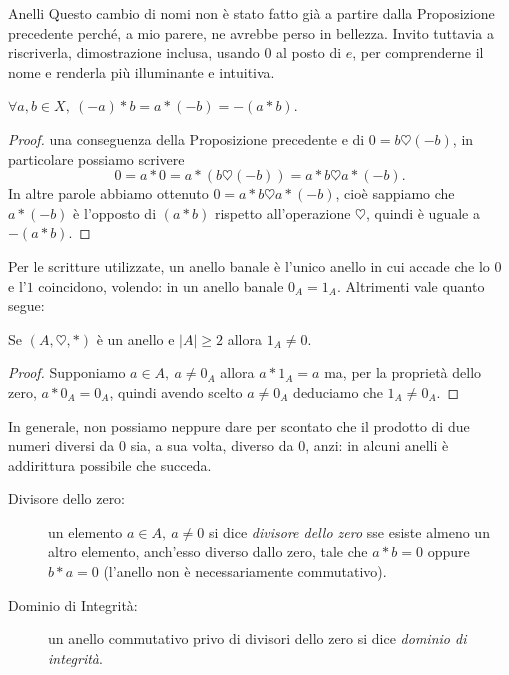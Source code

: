 \begin{subsubsection}{Anelli}
			Questo cambio di nomi non è stato fatto già a partire dalla Proposizione precedente perché, a mio parere, ne avrebbe perso in bellezza. Invito tuttavia a riscriverla, dimostrazione inclusa, usando $0$ al posto di $e$, per comprenderne il nome e renderla più illuminante e intuitiva.
			\begin{prop}
				$\forall a,b\in X,\ (-a)\ast b=a\ast(-b)=-(a\ast b)$.
			\end{prop}
			\begin{proof}
				\Egrave una conseguenza della Proposizione precedente e di $0=b\heartsuit(-b)$, in particolare possiamo scrivere
				\begin{equation*}
					 0=a*0=a*(b\heartsuit(-b))=a*b\heartsuit a*(-b).
				\end{equation*}
				In altre parole abbiamo ottenuto $0=a*b\heartsuit a*(-b)$, cioè sappiamo che $a*(-b)$ è l'opposto di $(a*b)$ rispetto all'operazione $\heartsuit$, quindi è uguale a $-(a*b)$.
			\end{proof}
			Per le scritture utilizzate, un anello banale è l'unico anello in cui accade che lo $0$ e l'$1$ coincidono, volendo: in un anello banale $0_A=1_A$.
			Altrimenti vale quanto segue:
			\begin{prop}
				Se $(A,\heartsuit,*)$ è un anello e $|A|\geq2$ allora $1_A\neq0$.
			\end{prop}
			\begin{proof}
				Supponiamo $a\in A,\ a\neq0_A$ allora $a*1_A=a$ ma, per la proprietà
				dello zero, $a*0_A=0_A$, quindi avendo scelto $a\neq0_A$ deduciamo che $1_A\neq0_A$.
			\end{proof}
			In generale, non possiamo neppure dare per scontato che il prodotto di due numeri diversi da $0$ sia, a sua volta, diverso da $0$, anzi: in alcuni anelli è addirittura possibile che succeda.
			\begin{description}
				\item[Divisore dello zero:] un elemento $a\in A,\ a\neq0$ si dice \emph{divisore dello zero} sse esiste almeno un altro elemento, anch'esso diverso dallo zero, tale che $a*b = 0$ oppure $b*a = 0$ (l’anello non è necessariamente commutativo).
				\item[Dominio di Integrità:] un anello commutativo privo di divisori dello zero si dice \emph{dominio di integrità}.
				

\end{description}
\end{subsubsection}
